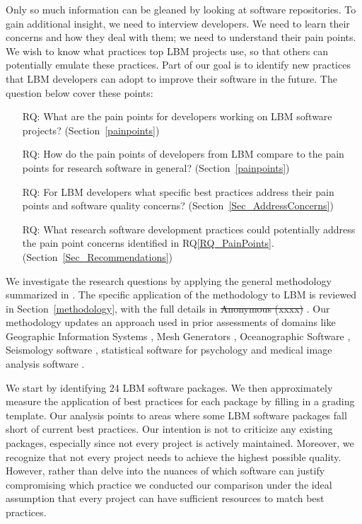 \documentclass[final, 3p, times, authoryear]{elsarticle}
\newcounter{rqnum} %
\newcommand{\rqref}[1]{RQ\ref{#1}}
\providecommand{\DIFdeltex}[1]{{\protect\color{red}\sout{#1}}}                      %
\providecommand{\DIFdelbegin}{} %
\providecommand{\DIFdelend}{} %
\providecommand{\DIFdel}[1]{\texorpdfstring{\DIFdeltex{#1}}{}} %
\begin{document}
Only so much information can be gleaned by looking at software repositories.  To
gain additional insight, we need to interview developers.  We need to learn
their concerns and how they deal with them; we need to understand their pain
points. We wish to know what practices top LBM projects use, so that
others can potentially emulate these practices. Part of our goal is to identify new
practices that LBM developers can adopt to improve their software in the future.
The question below cover these points: 

\begin{enumerate}
	\item [RQ\refstepcounter{rqnum}\therqnum \label{RQ_PainPoints}:] What are
	the pain points for developers working on LBM software projects?
	(Section~\ref{painpoints})
	\item [RQ\refstepcounter{rqnum}\therqnum \label{RQ_ComparePainPoints}:] How
	do the pain points of developers from LBM compare to the pain points
	for research software in general? (Section~\ref{painpoints})
	\item [RQ\refstepcounter{rqnum}\therqnum \label{RQ_Concerns}:] For LBM
	developers what specific best practices address their pain points
	and software quality concerns? (Section~\ref{Sec_AddressConcerns})
	\item [RQ\refstepcounter{rqnum}\therqnum \label{RQ_Recommend}:]
	What research software development practices could potentially address the
	pain point concerns identified in \rqref{RQ_PainPoints}.
	(Section~\ref{Sec_Recommendations})
\end{enumerate}

We investigate the research questions by applying the general methodology
summarized in \citet{SmithEtAl2021, SmithAndMichalski2022}. The specific
application of the methodology to LBM is reviewed in Section~\ref{methodology},
with the full details in \DIFdelbegin \DIFdel{Anonymous (xxxx)}
\DIFdelend \citet{Michalski2021}. Our methodology updates
an approach used in prior assessments of domains like Geographic Information
Systems \citep{SmithEtAl2018_arXivGIS}, Mesh Generators \citep{SmithEtAl2016},
Oceanographic Software \citep{smith2015state}, Seismology software
\citep{SmithEtAl2018}, statistical software for psychology
\citep{SmithEtAl2018_StatSoft} and medical image analysis software
\citep{Dong2021}.

We start by identifying 24 LBM software packages.  We then approximately measure
the application of best practices for each package by filling in a grading
template. Our analysis points to areas where some LBM software packages fall
short of current best practices.  Our intention is not to criticize any existing
packages, especially since not every project is actively maintained.  Moreover,
we recognize that not every project needs to achieve the highest possible
quality.  However, rather than delve into the nuances of which software can
justify compromising which practice we conducted our comparison under the ideal
assumption that every project can have sufficient resources to match best
practices.
\end{document}
